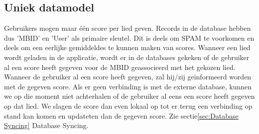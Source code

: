 \documentclass[11pt,a4paper]{article}
\begin{document}
	\subsection{Uniek datamodel}
	\label{sec:Uniek datamodel}
	Gebruikers mogen maar één score per lied geven. Records in de database hebben dus 'MBID' en 'User' als primaire sleutel. Dit is deels om SPAM te voorkomen en deels om een eerlijke gemiddeldes te kunnen maken van scores. Wanneer een lied wordt geladen in de applicatie, wordt er in de databases gekeken of de gebruiker al een score heeft gegeven voor de MBID geassocieerd met het gekozen lied. Wanneer de gebruiker al een score heeft gegeven, zal hij/zij geinformeerd worden met de gegeven score. 
	Als er geen verbinding is met de externe database, kunnen we op die moment niet achterhalen of de gebruiker al eens een score heeft gegeven op dat lied. We slagen de score dan even lokaal op tot er terug een verbinding op stand kan komen en updateten dan de gegeven score. Zie sectie\ref{sec:Database Syncing} Database Syncing.
	
\end{document}

